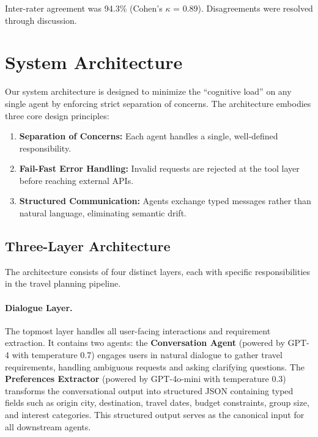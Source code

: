 \documentclass[preprint,review,12pt]{elsarticle}
\begin{document}
Inter-rater agreement was 94.3\% (Cohen's $\kappa$ = 0.89). Disagreements were resolved through discussion.

\section{System Architecture}
\label{sec:architecture}

Our system architecture is designed to minimize the ``cognitive load'' on any single agent by enforcing strict separation of concerns. The architecture embodies three core design principles:

\begin{enumerate}
    \item \textbf{Separation of Concerns:} Each agent handles a single, well-defined responsibility.
    \item \textbf{Fail-Fast Error Handling:} Invalid requests are rejected at the tool layer before reaching external APIs.
    \item \textbf{Structured Communication:} Agents exchange typed messages rather than natural language, eliminating semantic drift.
\end{enumerate}

\subsection{Three-Layer Architecture}

The architecture consists of four distinct layers, each with specific responsibilities in the travel planning pipeline.

\paragraph{Dialogue Layer.} The topmost layer handles all user-facing interactions and requirement extraction. It contains two agents: the \textbf{Conversation Agent} (powered by GPT-4 with temperature 0.7) engages users in natural dialogue to gather travel requirements, handling ambiguous requests and asking clarifying questions. The \textbf{Preferences Extractor} (powered by GPT-4o-mini with temperature 0.3) transforms the conversational output into structured JSON containing typed fields such as origin city, destination, travel dates, budget constraints, group size, and interest categories. This structured output serves as the canonical input for all downstream agents.
\end{document}
